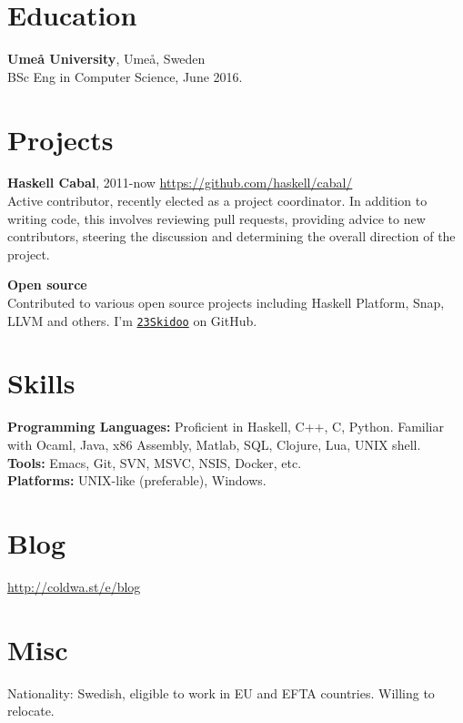 \documentclass[margin,line]{res}
\begin{document}
\begin{resume}
\section{\sc Education}
{\bf Umeå University}, Umeå, Sweden\\
BSc Eng in Computer Science, June 2016.

\section{\sc Projects}

{\bf Haskell Cabal}, 2011-now \hfill \url{https://github.com/haskell/cabal/}\\
Active contributor, recently elected as a project coordinator. In addition to
writing code, this involves reviewing pull requests, providing advice to new
contributors, steering the discussion and determining the overall direction of
the project.

{\bf Open source}\\ Contributed to various open source projects including
Haskell Platform, Snap, LLVM and others. I'm
\href{https://github.com/23Skidoo/}{\texttt{23Skidoo}} on GitHub.

\section{\sc Skills}

{\bf Programming Languages:} Proficient in Haskell, C++, C, Python. Familiar
with Ocaml, Java, x86 Assembly, Matlab, SQL, Clojure, Lua, UNIX shell. \\
{\bf Tools:} Emacs, Git, SVN, MSVC, NSIS, Docker, etc.\\
{\bf Platforms:} UNIX-like (preferable), Windows.

\section{\sc Blog}
\url{http://coldwa.st/e/blog}

\section{\sc Misc}

Nationality: Swedish, eligible to work in EU and EFTA countries. Willing to relocate.

\end{resume}
\end{document}
